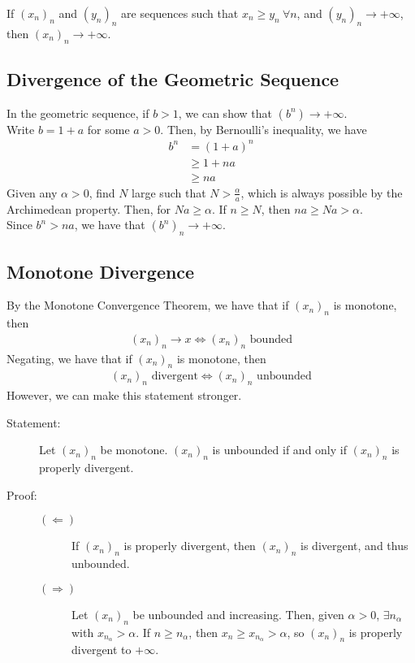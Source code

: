 \documentclass[10pt]{extarticle}
\begin{document}
    If $(x_n)_n$ and $(y_n)_n$ are sequences such that $x_n \geq y_n~\forall n$, and $(y_n)_n \rightarrow +\infty$, then $(x_n)_n \rightarrow +\infty$.
  \subsection{Divergence of the Geometric Sequence}%
    In the geometric sequence, if $b > 1$, we can show that $\left(b^n\right) \rightarrow +\infty$.\\

    Write $b = 1 + a$ for some $a > 0$. Then, by Bernoulli's inequality, we have
    \begin{align*}
      b^n &= (1+a)^n \\
          &\geq 1 + na\\
          &\geq na
    \end{align*}
    Given any $\alpha > 0$, find $N$ large such that $N > \frac{\alpha}{a}$, which is always possible by the Archimedean property. Then, for $Na \geq \alpha$. If $n\geq N$, then $na \geq Na > \alpha$.\\

    Since $b^n > na$, we have that $\left(b^n\right)_n \rightarrow +\infty$.
  \subsection{Monotone Divergence}%
    By the Monotone Convergence Theorem, we have that if $(x_n)_n$ is monotone, then
    \begin{align*}
      (x_n)_n\rightarrow x \Leftrightarrow (x_n)_n \text{ bounded}
    \end{align*}
    Negating, we have that if $(x_n)_n$ is monotone, then
    \begin{align*}
      (x_n)_n\text{ divergent} \Leftrightarrow (x_n)_n \text{ unbounded}
    \end{align*}
    However, we can make this statement stronger.
    \begin{description}
      \item[Statement:] Let $(x_n)_n$ be monotone. $(x_n)_n$ is unbounded if and only if $(x_n)_n$ is properly divergent.
      \item[Proof:] \hfill
        \begin{description}
          \item[$(\Leftarrow)$] If $(x_n)_n$ is properly divergent, then $(x_n)_n$ is divergent, and thus unbounded.
          \item[$(\Rightarrow)$] Let $(x_n)_n$ be unbounded and increasing. Then, given $\alpha > 0$, $\exists n_{\alpha}$ with $x_{n_\alpha} > \alpha$. If $n \geq n_{\alpha}$, then $x_{n} \geq x_{n_{\alpha}} > \alpha$, so $(x_n)_n$ is properly divergent to $+\infty$.
        \end{description}
    \end{description}
\end{document}
